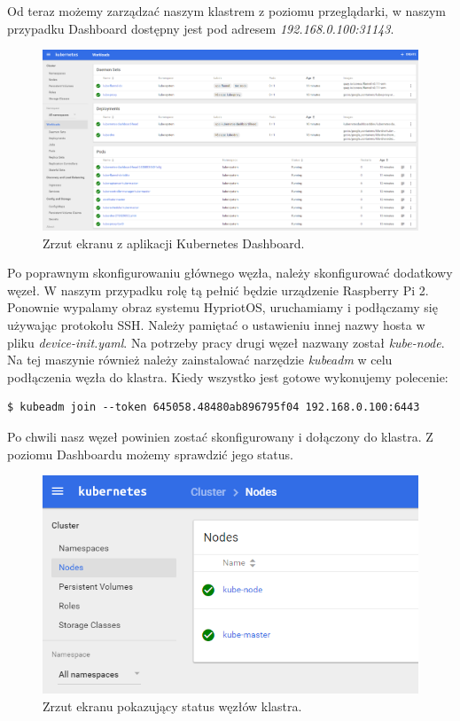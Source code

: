 \documentclass[12pt]{report}
\begin{document}
{Od teraz możemy zarządzać naszym klastrem z poziomu przeglądarki, w naszym przypadku Dashboard dostępny jest pod adresem \textit{192.168.0.100:31143}.

\begin{figure}[h]
	\centering
	\includegraphics[width=1\textwidth]{images/dashboard.png}
	\caption{Zrzut ekranu z aplikacji Kubernetes Dashboard.}
\end{figure}
\FloatBarrier

Po poprawnym skonfigurowaniu głównego węzła, należy skonfigurować dodatkowy węzeł. W naszym przypadku rolę tą pełnić będzie urządzenie Raspberry Pi 2. Ponownie wypalamy obraz systemu HypriotOS, uruchamiamy i podłączamy się używając protokołu SSH. Należy pamiętać o ustawieniu innej nazwy hosta w pliku \textit{device-init.yaml}. Na potrzeby pracy drugi węzeł nazwany został \textit{kube-node}. Na tej maszynie również należy zainstalować narzędzie \textit{kubeadm} w celu podłączenia węzła do klastra. Kiedy wszystko jest gotowe wykonujemy polecenie:

\begin{lstlisting}
$ kubeadm join --token 645058.48480ab896795f04 192.168.0.100:6443
\end{lstlisting}

Po chwili nasz węzeł powinien zostać skonfigurowany i dołączony do klastra. Z poziomu Dashboardu możemy sprawdzić jego status.

\begin{figure}[h]
	\centering
	\includegraphics[width=1\textwidth]{images/node_status.png}
	\caption{Zrzut ekranu pokazujący status węzłów klastra.}
\end{figure}
\FloatBarrier

}
\end{document}
